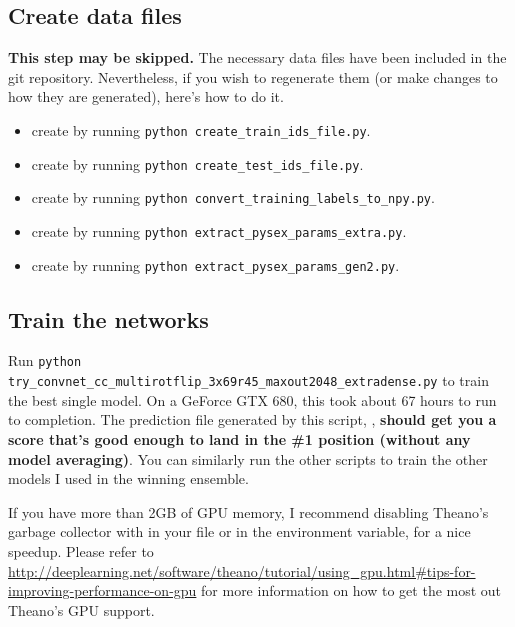 \documentclass[a4paper,10pt]{article}
\begin{document}
\subsection{Create data files}

\textbf{This step may be skipped.} The necessary data files have been included in the git repository. Nevertheless, if you wish to regenerate them (or make changes to how they are generated), here's how to do it.

\begin{itemize}
 \item create  by running \texttt{python create\_train\_ids\_file.py}.
 \item create  by running \texttt{python create\_test\_ids\_file.py}.
 \item create  by running \texttt{python convert\_training\_labels\_to\_npy.py}.
 \item create  by running \texttt{python extract\_pysex\_params\_extra.py}.
 \item create  by running \texttt{python extract\_pysex\_params\_gen2.py}.
\end{itemize}

\subsection{Train the networks}

Run \texttt{python try\_convnet\_cc\_multirotflip\_3x69r45\_maxout2048\_extradense.py} to train the best single model. On a GeForce GTX 680, this took about 67 hours to run to completion. The prediction file generated by this script, , \textbf{should get you a score that's good enough to land in the \#1 position (without any model averaging)}. You can similarly run the other  scripts to train the other models I used in the winning ensemble.

If you have more than 2GB of GPU memory, I recommend disabling Theano's garbage collector with  in your  file or in the  environment variable, for a nice speedup. Please refer to \url{http://deeplearning.net/software/theano/tutorial/using_gpu.html#tips-for-improving-performance-on-gpu} for more information on how to get the most out Theano's GPU support.
\end{document}
